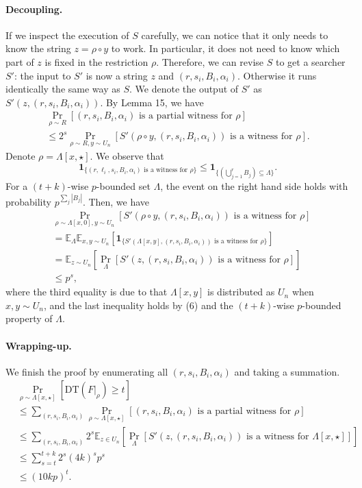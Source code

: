 \paragraph{Decoupling.} If we inspect the execution of $S$ carefully, we can notice that it only needs to know the string $z=\rho\circ y$ to work. In particular, it does not need to know which part of $z$ is fixed in the restriction $\rho$. Therefore, we can revise $S$ to get a searcher $S'$: the input to $S'$ is now a string $z$ and $(r,s_i,B_i,\alpha_i)$. Otherwise it runs identically the same way as $S$. We denote the output of $S'$ as $S'(z,(r,s_i,B_i,\alpha_i))$. By Lemma 15, we have
\begin{multline*}\Pr_{\rho\sim R}[(r,s_i,B_i,\alpha_i)\text{ is a partial witness for }\rho]\\\le2^s\Pr_{\rho\sim R,y\sim U_n}[S'(\rho\circ y,(r,s_i,B_i,\alpha_i))\text{ is a witness for }\rho].\end{multline*}
Denote $\rho=\Lambda[x,\star]$. We observe that
\[\mathbf1_{\{(r,\ell_i,s_i,B_i,\alpha_i)\text{ is a witness for }\rho\}}\le\mathbf1_{\{(\bigcup_{j=1}^rB_j)\subseteq\Lambda\}}.\tag{6}\]
For a $(t+k)$-wise $p$-bounded set $\Lambda$, the event on the right hand side holds with probability $p^{\sum_j|B_j|}$. Then, we have
\begin{align*}&\Pr_{\rho\sim\Lambda[x,0],y\sim U_n}[S'(\rho\circ y,(r,s_i,B_i,\alpha_i))\text{ is a witness for }\rho]\\&=\mathbb E_\Lambda\mathbb E_{x,y\sim U_n}[\mathbf1_{\{S'(\Lambda[x,y],(r,s_i,B_i,\alpha_i))\text{ is a witness for }\rho\}}]\\&=\mathbb E_{z\sim U_n}\left[\Pr_\Lambda[S'(z,(r,s_i,B_i,\alpha_i))\text{ is a witness for }\rho]\right]\\&\le p^s,\end{align*}
where the third equality is due to that $\Lambda[x,y]$ is distributed as $U_n$ when $x,y\sim U_n$, and the last inequality holds by (6) and the $(t+k)$-wise $p$-bounded property of $\Lambda$.
\paragraph{Wrapping-up.} We finish the proof by enumerating all $(r,s_i,B_i,\alpha_i)$ and taking a summation.
\begin{align*}&\Pr_{\rho\sim\Lambda[x,\star]}[\mathrm{DT}(F|_\rho)\ge t]\\&\le\sum_{(r,s_i,B_i,\alpha_i)}\Pr_{\rho\sim\Lambda[x,\star]}[(r,s_i,B_i,\alpha_i)\text{ is a partial witness for }\rho]\\&\le\sum_{(r,s_i,B_i,\alpha_i)}2^s\mathbb E_{z\in U_n}\left[\Pr_\Lambda[S'(z,(r,s_i,B_i,\alpha_i))\text{ is a witness for }\Lambda[x,\star]]\right]\\&\le\sum_{s=t}^{t+k}2^s(4k)^sp^s\\&\le(10kp)^t.\tag{7}\end{align*}
